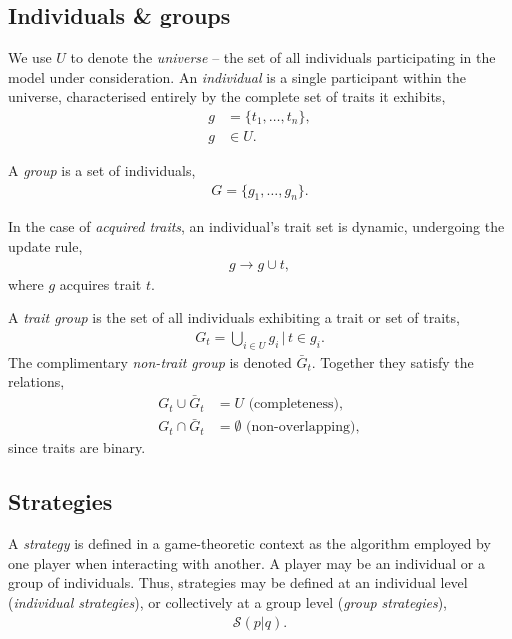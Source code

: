 \documentclass[aps,rmp,twocolumn,amsmath,amssymb,nofootinbib,superscriptaddress]{revtex4}
\begin{document}
\subsection{Individuals \& groups}

We use $U$ to denote the \textit{universe} -- the set of all individuals participating in the model under consideration. An \textit{individual} is a single participant within the universe, characterised entirely by the complete set of traits it exhibits,
\begin{align}
	g &= \{t_1,\dots,t_n\},\nonumber\\
	g &\in U.
\end{align}

A \textit{group} is a set of individuals,
\begin{align}
	G = \{g_1,\dots,g_n\}.	
\end{align}

In the case of \textit{acquired traits}, an individual's trait set is dynamic, undergoing the update rule,
\begin{align}
	g\to g\cup t,	
\end{align}
where $g$ acquires trait $t$.

A \textit{trait group} is the set of all individuals exhibiting a trait or set of traits,
\begin{align}
	G_t = \bigcup_{i\in U} g_i \,|\, t\in g_i.
\end{align}
The complimentary \textit{non-trait group} is denoted $\bar G_t$. Together they satisfy the relations,
\begin{align}
G_t \cup \bar G_t &= U \,\,\text{(completeness)},\nonumber\\
G_t \cap \bar G_t &= \emptyset \,\,\text{(non-overlapping)},
\end{align}
since traits are binary.

\subsection{Strategies}

A \textit{strategy} is defined in a game-theoretic context as the algorithm employed by one player when interacting with another. A player may be an individual or a group of individuals. Thus, strategies may be defined at an individual level (\textit{individual strategies}), or collectively at a group level (\textit{group strategies}),
\begin{align}
	\mathcal{S}(p|q).	
\end{align}
\end{document}
